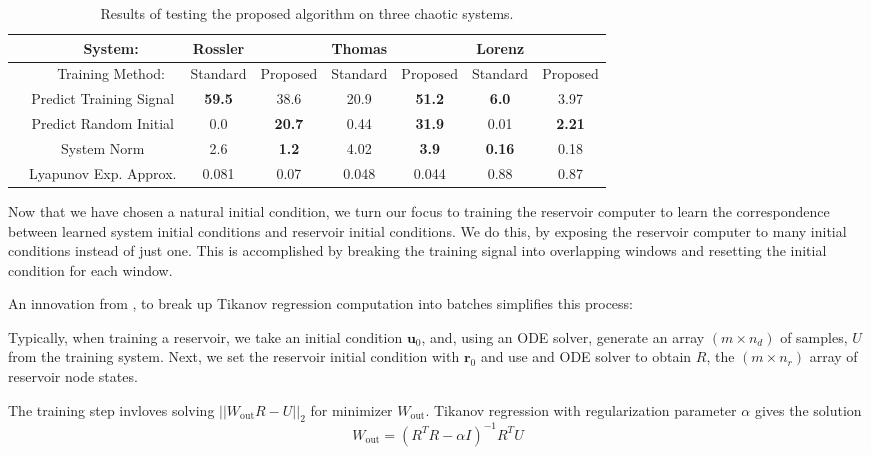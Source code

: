 \documentclass[journal]{journal}
\begin{document}
 
\begin{table}[!t] \label{table:results}
\begin{center}
\caption{Results of testing the proposed algorithm on three chaotic systems.}
 \begin{tabular}{| c c c | c c  | c c | c c |} 
 \hline
& & System: & Rossler&  & Thomas & & Lorenz & \\ 
 \hline
& & Training Method: & Standard & Proposed & Standard & Proposed & Standard & Proposed\\
 \hline
& \multicolumn{2}{c|}{Predict Training Signal} & \textbf{59.5} & 38.6 & 20.9 & \textbf{51.2} & \textbf{6.0} & 3.97\\ 
& \multicolumn{2}{c|}{Predict Random Initial} & 0.0 & \textbf{20.7} & 0.44 & \textbf{31.9} & 0.01 & \textbf{2.21}\\
& \multicolumn{2}{c|}{System Norm} & 2.6 & \textbf{1.2} & 4.02 & \textbf{3.9} & \textbf{0.16} & 0.18\\
& \multicolumn{2}{c|}{Lyapunov Exp. Approx.} & 0.081 & 0.07 & 0.048 & 0.044 & 0.88 & 0.87\\
\hline
\end{tabular}
\end{center}
\end{table}

Now that we have chosen a natural initial condition, we turn our focus to training the reservoir computer to learn the correspondence between learned system initial conditions and reservoir initial conditions. We do this, by exposing the reservoir computer to many initial conditions instead of just one. This is accomplished by breaking the training signal into overlapping windows and resetting the initial condition for each window.

An innovation from \cite{RNNCompare}, to break up Tikanov regression computation into batches simplifies this process:

Typically, when training a reservoir, we take an initial condition $\mathbf{u}_0$, and, using an ODE solver, generate an array $(m \times n_d)$ of samples, $U$ from the training system.
Next, we set the reservoir initial condition with $\mathbf{r}_0$ and use and ODE solver to obtain $R$, the $(m \times n_r)$ array of reservoir node states.

The training step invloves solving $||W_\text{out} R - U||_2$ for minimizer $W_\text{out}$. Tikanov regression with regularization parameter  $\alpha$ gives the solution
\[
W_\text{out} = (R^TR - \alpha I)^{-1} R^T U
\]
\end{document}
